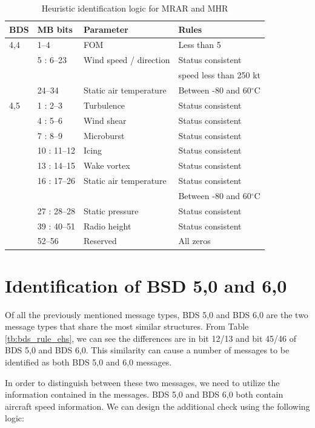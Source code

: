 \begin{table}
\footnotesize
\centering
\small
\caption{Heuristic identification logic for MRAR and MHR}
\label{tb:bds_rule_mrar}
\begin{tabular}{|l|l|l|l|}
\hline
\textbf{BDS} & \textbf{MB bits} & \textbf{Parameter} & \textbf{Rules} \\ \hline \hline
4,4 & 1--4 & FOM & Less than 5 \\ \cline{2-4} 
& 5 : 6--23 & Wind speed / direction & Status consistent \\ 
& & & speed less than 250 kt \\ \cline{2-4} 
& 24--34 & Static air temperature & Between -80 and 60$^\circ$C \\ \hline \hline
4,5 & 1 : 2--3 & Turbulence & Status consistent \\ \cline{2-4} 
& 4 : 5--6 & Wind shear & Status consistent \\ \cline{2-4} 
& 7 : 8--9 & Microburst & Status consistent \\ \cline{2-4} 
& 10 : 11--12 & Icing & Status consistent \\ \cline{2-4} 
& 13 : 14--15 & Wake vortex & Status consistent \\ \cline{2-4} 
& 16 : 17--26 & Static air temperature & Status consistent \\
& & & Between -80 and 60$^\circ$C \\ \cline{2-4} 
& 27 : 28--28 & Static pressure & Status consistent \\ \cline{2-4} 
& 39 : 40--51 & Radio height & Status consistent \\ \cline{2-4} 
& 52--56 & Reserved & All zeros \\ \hline
\end{tabular}
\end{table}




\section{Identification of BSD 5,0 and 6,0}

Of all the previously mentioned message types, BDS 5,0 and BDS 6,0 are the two message types that share the most similar structures. From Table \ref{tb:bds_rule_ehs}, we can see the differences are in bit 12/13 and bit 45/46 of BDS 5,0 and BDS 6,0. This similarity can cause a number of messages to be identified as both BDS 5,0 and 6,0 messages.

In order to distinguish between these two messages, we need to utilize the information contained in the messages. BDS 5,0 and BDS 6,0 both contain aircraft speed information. We can design the additional check using the following logic:


